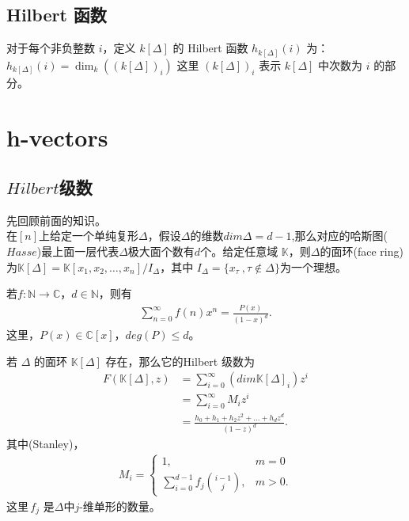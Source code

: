 \subsection{Hilbert 函数}
\begin{definition}
对于每个非负整数 $i$，定义 $k[\Delta]$ 的 Hilbert 函数 $h_{k[\Delta]}(i)$ 为：
$ h_{k[\Delta]}(i) = \dim_k ((k[\Delta])_i) $
这里 $(k[\Delta])_i$ 表示 $k[\Delta]$ 中次数为 $i$ 的部分。
\end{definition}

\section{h-vectors}
\subsection{$Hilbert$级数 }
先回顾前面的知识。\\
在$[n]$上给定一个单纯复形$\Delta$，假设$\Delta$的维数$dim \Delta =d-1$,那么对应的哈斯图($Hasse$)最上面一层代表$\Delta$极大面个数有$d$个。给定任意域 ${\mathbb{K}}$，则$\Delta$的面环(face ring)为$\mathbb{K}[\Delta] =\mathbb{K}[x_1, x_2, \ldots, x_n]/I_\Delta$，其中
$I_\Delta =\{x_{\tau}\ ,\tau \notin \Delta\}$为一个理想。
\begin{lemma}
若$f: \mathbb{N} \rightarrow \mathbb{C}$，$d \in \mathbb{N}$，则有
\begin{align}
\sum_{n=0}^{\infty}f(n)x^{n}=\frac{P(x)}{(1-x)^d}.
\label{eq1}
\end{align}
这里，$P(x) \in \mathbb{C}[x]$，$deg(P) \leq d$。
\end{lemma}

\begin{df}
若 $\Delta$ 的面环 $\mathbb{K}[\Delta]$ 存在，那么它的Hilbert 级数为
\begin{align}
F(\mathbb{K}[\Delta],z)&=\sum_{i=0}^{\infty}(dim\mathbb{K}[\Delta]_{i})z^{i}\nonumber \\[0.5ex]
&=\sum_{i=0}^{\infty}M_{i}z^{i}\nonumber \\[0.5ex]
&=\frac{h_{0}+h_{1}+h_{2}z^2+...+h_{d}z^{d}}{(1-z)^d}.\label{eq2}
\end{align}
其中(Stanley)，
\begin{align}
M_{i} = \begin{cases}
1, & m = 0 \\
\sum_{i=0}^{d-1} f_j \binom{i-1}{j}, & m > 0.
\end{cases} \label{eq3}
\end{align}
这里\,$f_{j}$ 是$\Delta$中$j$-维单形的数量。
\end{df}\label{Ehrhart1}

